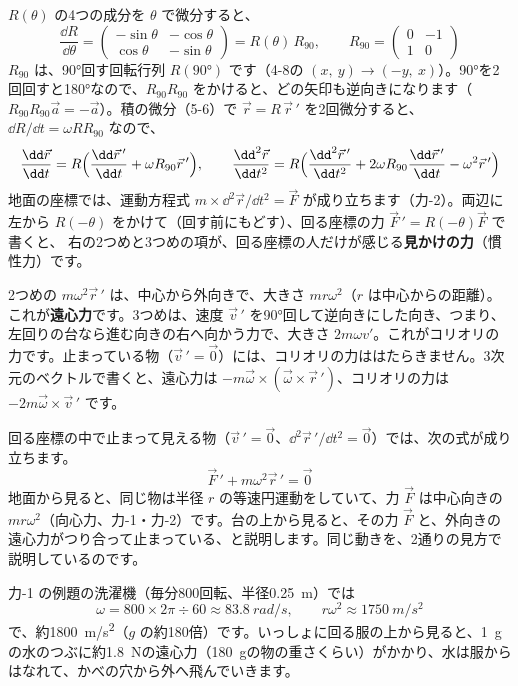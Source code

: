 $R(\theta)$ の4つの成分を $\theta$ で微分すると、
\[\frac{\dd R}{\dd\theta}=\begin{pmatrix}-\sin\theta&-\cos\theta\\ \cos\theta&-\sin\theta\end{pmatrix}=R(\theta)\,R_{90},\qquad R_{90}=\begin{pmatrix}0&-1\\1&0\end{pmatrix}\]
$R_{90}$ は、\ang{90}回す回転行列 $R(\ang{90})$ です（4-8の $(x,\ y)\to(-y,\ x)$）。\ang{90}を2回回すと\ang{180}なので、$R_{90}R_{90}$ をかけると、どの矢印も逆向きになります（$R_{90}R_{90}\vec a=-\vec a$）。積の微分（5-6）で $\vec r=R\,\vec r\,'$ を2回微分すると、$\dd R/\dd t=\omega R R_{90}$ なので、
\[\frac{\dd\vec r}{\dd t}=R\Bigl(\frac{\dd\vec r\,'}{\dd t}+\omega R_{90}\vec r\,'\Bigr),\qquad \frac{\dd^2\vec r}{\dd t^2}=R\Bigl(\frac{\dd^2\vec r\,'}{\dd t^2}+2\omega R_{90}\frac{\dd\vec r\,'}{\dd t}-\omega^2\vec r\,'\Bigr)\]
地面の座標では、運動方程式 $m\times\dd^2\vec r/\dd t^2=\vec F$ が成り立ちます（力-2）。両辺に左から $R(-\theta)$ をかけて（回す前にもどす）、回る座標の力 $\vec F\,'=R(-\theta)\vec F$ で書くと、
右の2つめと3つめの項が、回る座標の人だけが感じる\textbf{見かけの力}（慣性力）です。
\begin{phyomi}[回る座標の運動方程式]
2つめの $m\omega^2\vec r\,'$ は、中心から外向きで、大きさ $mr\omega^2$（$r$ は中心からの距離）。これが\textbf{遠心力}です。3つめは、速度 $\vec v\,'$ を\ang{90}回して逆向きにした向き、つまり、左回りの台なら進む向きの右へ向かう力で、大きさ $2m\omega v'$。これがコリオリの力です。止まっている物（$\vec v\,'=\vec 0$）には、コリオリの力ははたらきません。3次元のベクトルで書くと、遠心力は $-m\vec\omega\times(\vec\omega\times\vec r\,')$、コリオリの力は $-2m\vec\omega\times\vec v\,'$ です。
\end{phyomi}
回る座標の中で止まって見える物（$\vec v\,'=\vec 0$、$\dd^2\vec r\,'/\dd t^2=\vec 0$）では、次の式が成り立ちます。
\[ \vec F\,'+m\omega^2\vec r\,'=\vec 0 \]
\label{ph:力-7:enshin}
地面から見ると、同じ物は半径 $r$ の等速円運動をしていて、力 $\vec F$ は中心向きの $mr\omega^2$（向心力、力-1・力-2）です。台の上から見ると、その力 $\vec F$ と、外向きの遠心力がつり合って止まっている、と説明します。同じ動きを、2通りの見方で説明しているのです。
\begin{phmijika}[洗濯機の脱水]
力-1 の例題の洗濯機（毎分800回転、半径\qty{0.25}{m}）では
\[ \omega=800\times2\pi\div60\approx\qty{83.8}{rad/s},\qquad r\omega^2\approx\qty{1750}{m/s^2} \]
で、約\qty{1800}{m/s^2}（$g$ の約180倍）です。いっしょに回る服の上から見ると、\qty{1}{g}の水のつぶに約\qty{1.8}{N}の遠心力（\qty{180}{g}の物の重さくらい）がかかり、水は服からはなれて、かべの穴から外へ飛んでいきます。
\end{phmijika}
